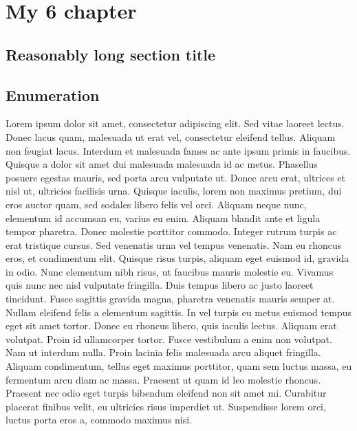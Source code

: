
\chapter{My 6 chapter}

\ifpdf
    \graphicspath{{Chapter6/Figs/Raster/}{Chapter6/Figs/PDF/}{Chapter6/Figs/}}
\else
    \graphicspath{{Chapter6/Figs/Vector/}{Chapter6/Figs/}}
\fi


\section[Short title]{Reasonably long section title}



\section*{Enumeration}
Lorem ipsum dolor sit amet, consectetur adipiscing elit. Sed vitae laoreet lectus.
Donec lacus quam, malesuada ut erat vel, consectetur eleifend tellus. Aliquam non
feugiat lacus. Interdum et malesuada fames ac ante ipsum primis in faucibus.
Quisque a dolor sit amet dui malesuada malesuada id ac metus. Phasellus posuere
egestas mauris, sed porta arcu vulputate ut. Donec arcu erat, ultrices et nisl ut,
ultricies facilisis urna. Quisque iaculis, lorem non maximus pretium, dui eros
auctor quam, sed sodales libero felis vel orci. Aliquam neque nunc, elementum id
accumsan eu, varius eu enim. Aliquam blandit ante et ligula tempor pharetra.
Donec molestie porttitor commodo. Integer rutrum turpis ac erat tristique cursus.
Sed venenatis urna vel tempus venenatis. Nam eu rhoncus eros, et condimentum elit.
Quisque risus turpis, aliquam eget euismod id, gravida in odio. Nunc elementum
nibh risus, ut faucibus mauris molestie eu.
Vivamus quis nunc nec nisl vulputate fringilla. Duis tempus libero ac justo
laoreet tincidunt. Fusce sagittis gravida magna, pharetra venenatis mauris
semper at. Nullam eleifend felis a elementum sagittis. In vel turpis eu metus
euismod tempus eget sit amet tortor. Donec eu rhoncus libero, quis iaculis lectus.
Aliquam erat volutpat. Proin id ullamcorper tortor. Fusce vestibulum a enim non
volutpat. Nam ut interdum nulla. Proin lacinia felis malesuada arcu aliquet fringilla.
Aliquam condimentum, tellus eget maximus porttitor, quam sem luctus massa,
eu fermentum arcu diam ac massa. Praesent ut quam id leo molestie rhoncus.
Praesent nec odio eget turpis bibendum eleifend non sit amet mi. Curabitur placerat
finibus velit, eu ultricies risus imperdiet ut. Suspendisse lorem orci, luctus
porta eros a, commodo maximus nisi.

